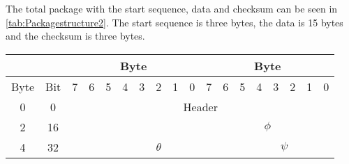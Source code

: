 The total package with the start sequence, data and checksum can be seen in \autoref{tab:Packagestructure2}. The start sequence is three bytes, the data is 15 bytes and the checksum is three bytes.
\begin{table}[H]
	\centering
	\begin{tabular}{llclllllllllllllll}
		\hline
		\multicolumn{2}{|c|}{}& \multicolumn{8}{c|}{Byte}                                                                                                                                                                           & \multicolumn{8}{c|}{Byte}                                                                                                                                                                                 \\ \hline
		\multicolumn{1}{|l|}{Byte} & \multicolumn{1}{l|}{Bit} & \multicolumn{1}{c|}{7} & \multicolumn{1}{c|}{6} & \multicolumn{1}{c|}{5} & \multicolumn{1}{c|}{4} & \multicolumn{1}{c|}{3} & \multicolumn{1}{c|}{2} & \multicolumn{1}{c|}{1} & \multicolumn{1}{c|}{0} & \multicolumn{1}{|c|}{7} & \multicolumn{1}{c|}{6} & \multicolumn{1}{c|}{5} & \multicolumn{1}{c|}{4} & \multicolumn{1}{c|}{3} & \multicolumn{1}{c|}{2} & \multicolumn{1}{c|}{1} & \multicolumn{1}{c|}{0} \\ \hline
		\multicolumn{1}{|c|}{0}    & \multicolumn{1}{c|}{0}   & \multicolumn{16}{c|}{Header}                                                                                                                                                                                                                                                                                                                                                                                        \\ \hline
		\multicolumn{1}{|c|}{2}    & \multicolumn{1}{c|}{16}  & \multicolumn{8}{c|}{}                                                                                                                                                                                 & \multicolumn{8}{c|}{$\phi$}                                                                                                                                                                                 \\ \hline
		\multicolumn{1}{|c|}{4}    & \multicolumn{1}{c|}{32}  & \multicolumn{1}{c|}{}  & \multicolumn{9}{c|}{$\theta$}                                                                                                                                                                                                  & \multicolumn{6}{c|}{$\psi$}                                                                                                                               \\ \hline

\end{tabular}
\end{table}
